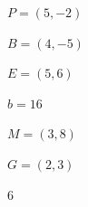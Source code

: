 \documentclass{oblivoir}
\begin{document}
\clearpage
\begin{minipage}[t]{0.49\textwidth}

%
\(P=(5,-2)\)

%
\(B=(4,-5)\)

%
\(E=(5,6)\)

%
\(b=16\)

%
\(M=(3,8)\)


%
\(G=(2,3)\)

%
\(6\)
\end{minipage}
\end{document}
